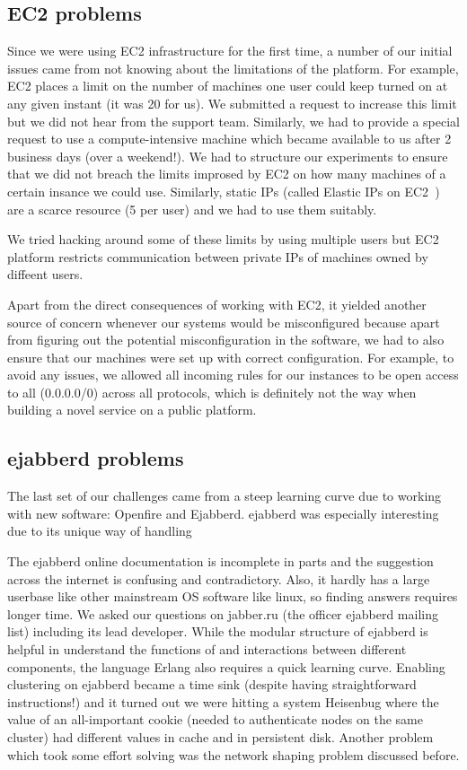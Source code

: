 \documentclass[a4paper, twocolumn]{article}
\begin{document}
\subsection{EC2 problems}
Since we were using EC2 infrastructure for the first time, a number of our initial issues came from not knowing about the limitations of the platform. For example, EC2 places a limit on the number of machines one user could keep turned on at any given instant (it was 20 for us). We submitted a request to increase this limit but we did not hear from the support team. Similarly, we had to provide a special request to use a compute-intensive machine which became available to us after 2 business days (over a weekend!). We had to structure our experiments to ensure that we did not breach the limits improsed by EC2 on how many machines of a certain insance we could use. Similarly, static IPs (called Elastic IPs on EC2~\cite{ec2_3})  are a scarce resource (5 per user) and we had to use them suitably. 

We tried hacking around some of these limits by using multiple users but EC2 platform restricts communication between private IPs of machines owned by diffeent users. 

Apart from the direct consequences of working with EC2, it yielded another source of concern whenever our systems would be misconfigured because apart from figuring out the potential misconfiguration in the software, we had to also ensure that our machines were set up with correct configuration. For example, to avoid any issues, we allowed all incoming rules for our instances to be open access to all (0.0.0.0/0) across all protocols, which is definitely not the way when building a novel service on a public platform. 

\subsection{ejabberd problems}
The last set of our challenges came from a steep learning curve due to working with new software: Openfire and Ejabberd. ejabberd was especially interesting due to its unique way of handling 

The ejabberd online documentation is incomplete in parts and the suggestion across the internet is confusing and contradictory. Also, it hardly has a large userbase like other mainstream OS software like linux, so finding answers requires longer time. We asked our questions on jabber.ru (the officer ejabberd mailing list) including its lead developer. While the modular structure of ejabberd is helpful in understand the functions of and interactions between different components, the language Erlang also requires a quick learning curve. Enabling clustering on ejabberd became a time sink (despite having straightforward instructions!) and it turned out we were hitting a system Heisenbug where the value of an all-important cookie (needed to authenticate nodes on the same cluster) had different values in cache and in persistent disk.  Another problem which took some effort solving was the network shaping problem discussed before. 
\end{document}
